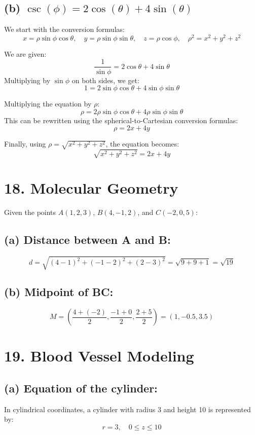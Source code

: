 \documentclass[11pt]{article}
\begin{document}
\subsection*{(b) \( \csc(\phi) = 2 \cos(\theta) + 4 \sin(\theta) \)}
We start with the conversion formulas:
\[
x = \rho \sin\phi \cos\theta, \quad y = \rho \sin\phi \sin\theta, \quad z = \rho \cos\phi, \quad \rho^2 = x^2 + y^2 + z^2
\]



We are given:
\[
\frac{1}{\sin\phi} = 2\cos\theta + 4\sin\theta
\]
Multiplying by \(\sin\phi\) on both sides, we get:
\[
1 = 2\sin\phi\cos\theta + 4\sin\phi\sin\theta
\]


Multiplying the equation by \(\rho\):
\[
\rho = 2\rho\sin\phi\cos\theta + 4\rho\sin\phi\sin\theta
\]
This can be rewritten using the spherical-to-Cartesian conversion formulas:
\[
\rho = 2x + 4y
\]



Finally, using \(\rho = \sqrt{x^2 + y^2 + z^2}\), the equation becomes:
\[
\sqrt{x^2 + y^2 + z^2} = 2x + 4y
\]

\section*{18. Molecular Geometry}
Given the points \(A(1, 2, 3)\), \(B(4, -1, 2)\), and \(C(-2, 0, 5)\):

\subsection*{(a) Distance between A and B:}
\[
d = \sqrt{(4 - 1)^2 + (-1 - 2)^2 + (2 - 3)^2} = \sqrt{9 + 9 + 1} = \sqrt{19}
\]

\subsection*{(b) Midpoint of BC:}
\[
M = \left( \frac{4 + (-2)}{2}, \frac{-1 + 0}{2}, \frac{2 + 5}{2} \right) = (1, -0.5, 3.5)
\]

\section*{19. Blood Vessel Modeling}
\subsection*{(a) Equation of the cylinder:}
In cylindrical coordinates, a cylinder with radius 3 and height 10 is represented by:
\[
r = 3, \quad 0 \leq z \leq 10
\]
\end{document}
